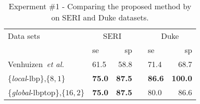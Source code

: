 
\begin{table}[h]
\caption{Experment \#1 - Comparing the proposed method by \cite{Venhuizen2015} on SERI and Duke datasets.}%
\centering
\scriptsize{
\begin{tabular}{l	lr c lr}
\toprule
Data sets 	& \multicolumn{2}{c}{SERI} & & \multicolumn{2}{c}{Duke} \\
  \cmidrule(l){2-3}  \cmidrule(l){5-6}
	         & \ac{se} & \ac{sp} & & \ac{se} & \ac{sp}\\
\midrule
Venhuizen~\textit{et al.} \cite{Venhuizen2015} 		& 61.5 & 58.8 & & 71.4 & 68.7\\
\{\emph{local}-\ac{lbp}\},$\{8,1\}$				   & \textbf{75.0} & \textbf{87.5} & & \textbf{86.6} & \textbf{100.0}   \\
\{\emph{global}-\ac{lbptop}\},$\{16,2\}$				& \textbf{75.0} & \textbf{87.5} & & 80.0 & 86.6  \\


\bottomrule
\end{tabular}}
\label{tab:table1-2}
\end{table}
